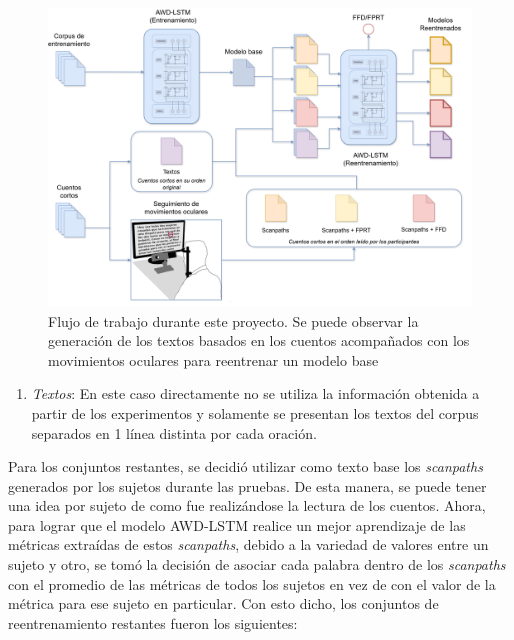 \begin{figure}[htb]
    \centering
    \includegraphics[width=1\textwidth]{imagenes/pipeline.png}
    \caption{Flujo de trabajo durante este proyecto. Se puede observar la generación de los textos basados en los cuentos acompañados con los movimientos oculares para reentrenar un modelo base}
    \label{fig:pipeline}
\end{figure}

\begin{enumerate}
    \item \textit{Textos}: En este caso directamente no se utiliza la información obtenida a partir de los experimentos y solamente se presentan los textos del corpus separados en 1 línea distinta por cada oración.
\end{enumerate}

Para los conjuntos restantes, se decidió utilizar como texto base los \textit{scanpaths} generados por los sujetos durante las pruebas. De esta manera, se puede tener una idea por sujeto de como fue realizándose la lectura de los cuentos. Ahora, para lograr que el modelo AWD-LSTM realice un mejor aprendizaje de las métricas extraídas de estos \textit{scanpaths}, debido a la variedad de valores entre un sujeto y otro, se tomó la decisión de asociar cada palabra dentro de los \textit{scanpaths} con el promedio de las métricas de todos los sujetos en vez de con el valor de la métrica para ese sujeto en particular. Con esto dicho, los conjuntos de reentrenamiento restantes fueron los siguientes:

